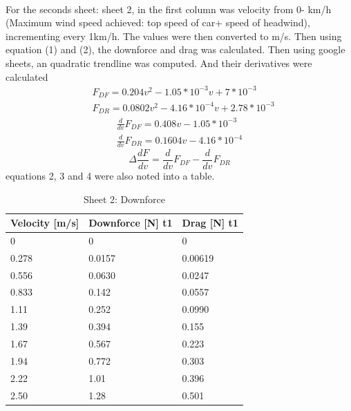 \documentclass[11pt, a4paper]{article}
\begin{document}
\\
For the seconds sheet: sheet 2, in the first column was velocity from 0- km/h (Maximum wind speed achieved: top speed of car+ speed of headwind), incrementing every 1km/h. The values were then converted to m/s.
Then using equation (1) and (2), the downforce and drag was calculated. Then using google sheets, an quadratic trendline was computed. And their derivatives were calculated
\begin{equation}
    \begin{split}
        &F_{DF}=0.204v^2-1.05*10^{-3}v+7*10^{-3} \\
        &F_{DR}=0.0802v^2-4.16*10^{-4}v+2.78*10^{-3}
    \end{split}
\end{equation}
\begin{equation}
    \begin{split}
        \frac{d}{dv}F_{DF}=0.408v-1.05*10^{-3}\\
        \frac{d}{dv}F_{DR}=0.1604v-4.16*10^{-4}
    \end{split}
\end{equation}
\begin{equation}
    \Delta \frac{dF}{dv}=\frac{d}{dv}F_{DF} - \frac{d}{dv}F_{DR}
\end{equation}
equations 2, 3 and 4 were also noted into a table.
\begin{table}[!ht]
    \centering
    \caption{Sheet 2: Downforce}
    \begin{tabular}{|l|l|l|}
    \hline
        \textbf{Velocity [m/s]} & \textbf{Downforce [N] t1} & \textbf{Drag [N] t1} \\ \hline
        0 & 0 & 0 \\ \hline
        0.278 & 0.0157 & 0.00619 \\ \hline
        0.556 & 0.0630 & 0.0247 \\ \hline
        0.833 & 0.142 & 0.0557 \\ \hline
        1.11 & 0.252 & 0.0990 \\ \hline
        1.39 & 0.394 & 0.155 \\ \hline
        1.67 & 0.567 & 0.223 \\ \hline
        1.94 & 0.772 & 0.303 \\ \hline
        2.22 & 1.01 & 0.396 \\ \hline
        2.50 & 1.28 & 0.501 \\ \hline
    \end{tabular}
~\label{tab:data2force}
\end{table}
\end{document}
